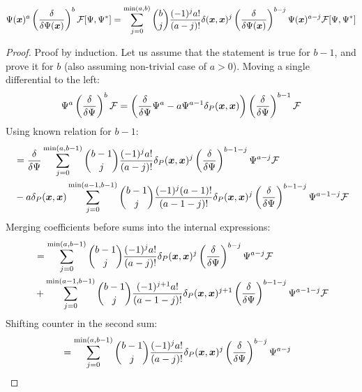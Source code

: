\begin{lemma}
\[
	\Psi(\boldsymbol{x})^a \left( \frac{\delta}{\delta \Psi(\boldsymbol{x})} \right)^b \mathcal{F}[\Psi, \Psi^*]
	= \sum_{j=0}^{\min(a, b)}
		\binom{b}{j} \frac{(-1)^j a!}{(a - j)!}
		\delta(\boldsymbol{x}, \boldsymbol{x})^j
		\left( \frac{\delta}{\delta \Psi(\boldsymbol{x})} \right)^{b - j}
		\Psi(\boldsymbol{x})^{a - j}
		\mathcal{F}[\Psi, \Psi^*]
\]
\end{lemma}
\begin{proof}
Proof by induction.
Let us assume that the statement is true for $b - 1$, and prove it for $b$
(also assuming non-trivial case of $a > 0$).
Moving a single differential to the left:
\[
	\Psi^a \left( \frac{\delta}{\delta \Psi} \right)^b \mathcal{F}
	= \left(
			\frac{\delta}{\delta \Psi} \Psi^a
			- a \Psi^{a - 1} \delta_P(\boldsymbol{x}, \boldsymbol{x})
		\right)
		\left( \frac{\delta}{\delta \Psi} \right)^{b-1}
		\mathcal{F}
\]
Using known relation for $b-1$:
\begin{equation*}
\begin{split}
	& = \frac{\delta}{\delta \Psi} \sum_{j = 0}^{\min(a, b-1)}
			\binom{b-1}{j} \frac{(-1)^j a!}{(a-j)!} \delta_P(\boldsymbol{x}, \boldsymbol{x})^j
			\left( \frac{\delta}{\delta \Psi} \right)^{b-1-j} \Psi^{a-j}
			\mathcal{F} \\
	& - a \delta_P(\boldsymbol{x}, \boldsymbol{x}) \sum_{j = 0}^{\min(a-1, b-1)}
			\binom{b-1}{j} \frac{(-1)^j (a-1)!}{(a-1-j)!} \delta_P(\boldsymbol{x}, \boldsymbol{x})^j
			\left( \frac{\delta}{\delta \Psi} \right)^{b-1-j} \Psi^{a-1-j}
			\mathcal{F}
\end{split}
\end{equation*}
Merging coefficients before sums into the internal expressions:
\begin{equation*}
\begin{split}
	& = \sum_{j = 0}^{\min(a, b-1)}
			\binom{b-1}{j} \frac{(-1)^j a!}{(a-j)!} \delta_P(\boldsymbol{x}, \boldsymbol{x})^j
			\left( \frac{\delta}{\delta \Psi} \right)^{b-j} \Psi^{a-j}
			\mathcal{F} \\
	& + \sum_{j = 0}^{\min(a-1, b-1)}
			\binom{b-1}{j} \frac{(-1)^{j+1} a!}{(a-1-j)!} \delta_P(\boldsymbol{x}, \boldsymbol{x})^{j+1}
			\left( \frac{\delta}{\delta \Psi} \right)^{b-1-j} \Psi^{a-1-j}
			\mathcal{F}
\end{split}
\end{equation*}
Shifting counter in the second sum:
\begin{equation*}
\begin{split}
	& = \sum_{j = 0}^{\min(a, b-1)}
			\binom{b-1}{j} \frac{(-1)^j a!}{(a-j)!} \delta_P(\xvec, \xvec)^j
			\left( \frac{\delta}{\delta \Psi} \right)^{b-j} \Psi^{a-j}

\end{split}
\end{equation*}
\end{proof}
